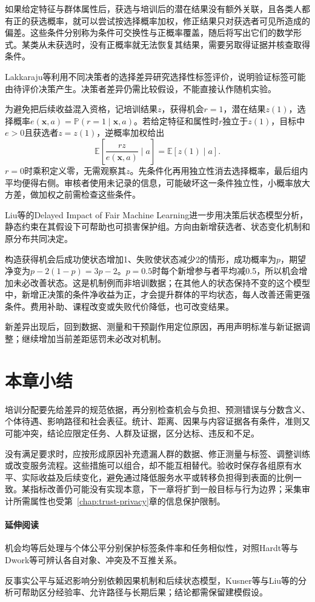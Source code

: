 如果给定特征与群体属性后，获选与培训后的潜在结果没有额外关联，且各类人都有正的获选概率，就可以尝试按选择概率加权，修正结果只对获选者可见所造成的偏差。这些条件分别称为条件可交换性与正概率覆盖，随后将写出它们的数学形式。某类从未获选时，没有正概率就无法恢复其结果，需要另取得证据并核查取得条件。

Lakkaraju等利用不同决策者的选择差异研究选择性标签评价，说明验证标签可能由待评价决策产生。决策者差异仍需比较假设，不能直接认作随机实验。

为避免把后续收益混入资格，记培训结果$z$，获得机会$r=1$，潜在结果$z(1)$，选择概率$e(\bm{x},a)=\mathbb P(r=1\mid\bm{x},a)$。若给定特征和属性时$r$独立于$z(1)$，目标中$e>0$且获选者$z=z(1)$，逆概率加权给出
\begin{equation}
 \mathbb E\!\left[\frac{r z}{e(\bm{x},a)}\mid a\right]
 =\mathbb E[z(1)\mid a].
 \label{eq:fairness-selective-weight}
\end{equation}
$r=0$时乘积定义零，无需观察其$z$。先条件化再用独立性消去选择概率，最后组内平均便得右侧。审核者使用未记录的信息，可能破坏这一条件独立性，小概率放大方差，做加权之前需检查这些条件。

Liu等的Delayed Impact of Fair Machine Learning进一步用决策后状态模型分析，静态约束在其假设下可帮助也可损害保护组。方向由新增获选者、状态变化机制和原分布共同决定。

构造获得机会后成功使状态增加1、失败使状态减少2的情形，成功概率为$p$，期望净变为$p-2(1-p)=3p-2$。$p=0.5$时每个新增参与者平均减0.5，所以机会增加未必改善状态。这是机制例而非培训数据；在其他人的状态保持不变的这个模型中，新增正决策的条件净收益为正，才会提升群体的平均状态，每人改善还需更强条件。费用补助、课程改变或失败代价降低，也可改变结果。

新差异出现后，回到数据、测量和干预副作用定位原因，再用声明标准与新证据调整；继续增加当前差距惩罚未必改对机制。

\section{本章小结}
\label{sec:fairness-summary}

培训分配要先给差异的规范依据，再分别检查机会与负担、预测错误与分数含义、个体待遇、影响路径和社会表征。统计、距离、因果与内容证据各有条件，准则又可能冲突，结论应限定任务、人群及证据，区分达标、违反和不足。

没有满足要求时，应按形成原因补充遗漏人群的数据、修正测量与标签、调整训练或改变服务流程。这些措施可以组合，却不能互相替代。验收时保存各组原有水平、实际收益及后续变化，避免通过降低服务水平或转移负担得到表面的比例一致。某指标改善仍可能没有实现本意，下一章将扩到一般目标与行为边界；采集审计所需属性也受第~\ref{chap:trust-privacy}章的信息保护限制。

\paragraph{延伸阅读}

机会均等后处理与个体公平分别保护标签条件率和任务相似性，对照Hardt等与Dwork等可辨认各自对象、冲突及不互推关系。

反事实公平与延迟影响分别依赖因果机制和后续状态模型，Kusner等与Liu等的分析可帮助区分经验率、允许路径与长期后果；结论都需保留建模假设。

